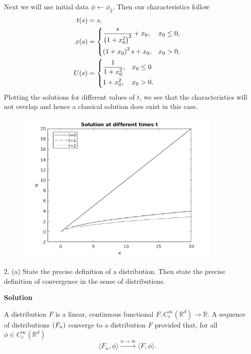 \documentclass{article}
\begin{document}
Next we will use initial data $\phi \gets \phi_2$. Then our
characteristics follow
%
\begin{align*}
    t(s) &= s, \\
    x(s) &=
        \begin{dcases}
            \frac{s}{\del{1 + x_0^2}^2} + x_0, & x_0 \leq 0, \\
            \del{1 + x_0}^2 s + x_0, & x_0 > 0,
        \end{dcases} \\
    U(s) &=
        \begin{dcases}
            \frac{1}{1 + x_0^2}, & x_0 \leq 0 \\
            1 + x_0^2, & x_0 > 0.
        \end{dcases}
\end{align*}
%
Plotting the solutions for different values of $t$, we see that the
characteristics will not overlap and hence a classical solution does
exist in this case.

\begin{figure}[H]
    \centering
    \includegraphics[width=10cm]{q1b2}
\end{figure}

\newpage

2. (a) State the precise definition of a distribution. Then state the
precise definition of convergence in the sense of distributions.

\textbf{Solution}

A distribution $F$ is a linear, continuous functional $F:
C_c^\infty(\mathbb{R}^d) \to \mathbb{R}$. A sequence of distributions
$\del{F_n}$ converge to a distribution $F$ provided that, for all $\phi
\in C_c^\infty(\mathbb{R}^d)$
%
\begin{equation*}
    \langle F_n, \phi \rangle \xrightarrow{n \to \infty} \langle F, \phi \rangle
    .
\end{equation*}
\end{document}
